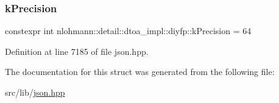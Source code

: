\subsubsection{\texorpdfstring{k\+Precision}{kPrecision}}
{\footnotesize\ttfamily constexpr int nlohmann\+::detail\+::dtoa\+\_\+impl\+::diyfp\+::k\+Precision = 64\hspace{0.3cm}{\ttfamily [static]}}



Definition at line 7185 of file json.\+hpp.



The documentation for this struct was generated from the following file\+:\begin{DoxyCompactItemize}
\item 
src/lib/\hyperlink{json_8hpp}{json.\+hpp}\end{DoxyCompactItemize}
